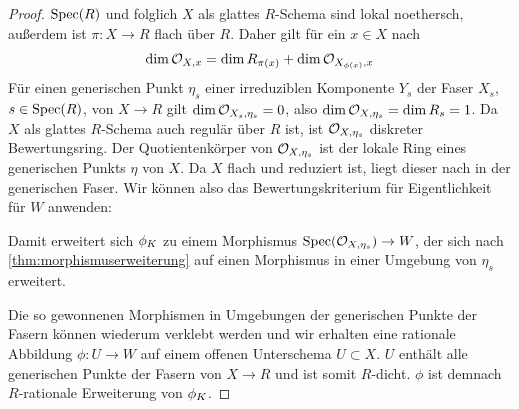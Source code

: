 \documentclass[german]{scrreprt}
\begin{document}
\begin{Korollar}
\begin{proof}
    $\operatorname{Spec}(R)$ und folglich $X$ als glattes $R$-Schema sind lokal
    noethersch, außerdem ist $\pi\colon X\to R$ flach über $R$. Daher
    gilt für ein $x\in X$ nach \cite{?}
    \begin{gather*}
      \dim\mathcal{O}_{X,x} = \dim R_{\pi(x)} + \dim\mathcal{O}_{X_{\phi(x)}, x}
    \end{gather*}
    Für einen generischen Punkt $\eta_{s}$ einer irreduziblen
    Komponente $Y_{s}$ der Faser $X_s$, $s\in\operatorname{Spec}(R)$,
    von $X\to R$ gilt $\dim\mathcal{O}_{X_s, \eta_{s}}=0$, also
    $\dim\mathcal{O}_{X,\eta_{s}}=\dim R_s=1$.
    Da $X$ als glattes $R$-Schema auch regulär über $R$ ist, ist
    $\mathcal{O}_{X,\eta_{s}}$ diskreter Bewertungsring.
    Der Quotientenkörper von $\mathcal{O}_{X,\eta_{s}}$ ist der lokale Ring
    eines generischen Punkts $\eta$ von $X$. Da $X$ flach und
    reduziert ist, liegt dieser nach
    \cite[Proposition III.9.7]{hartshorne} in der generischen Faser.
    Wir können also das Bewertungskriterium für Eigentlichkeit für $W$
    anwenden:
      \begin{center}
      \end{center}
    Damit erweitert sich $\phi_{K}$ zu einem Morphismus
    $\operatorname{Spec}(\mathcal{O}_{X,\eta_{s}})\to W$, der sich nach
    \autoref{thm:morphismuserweiterung} auf einen Morphismus in einer
    Umgebung von $\eta_{s}$ erweitert.
    
    Die so gewonnenen Morphismen in Umgebungen der generischen Punkte
    der Fasern können wiederum verklebt werden und
    wir erhalten eine rationale Abbildung $\phi\colon U\to W$ auf
    einem offenen Unterschema $U\subset X$.
    $U$ enthält alle generischen Punkte der Fasern von $X\to R$ und
    ist somit $R$-dicht.
    $\phi$ ist demnach $R$-rationale Erweiterung von $\phi_{K}$.
    


\end{proof}
\end{Korollar}
\end{document}
